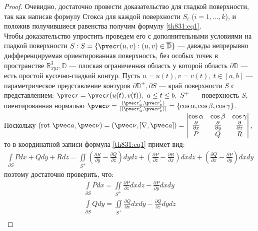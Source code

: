 \begin{proof}
  Очевидно, достаточно провести доказательство для гладкой поверхности, так как
  написав формулу Стокса для каждой поверхности $S_i$ ($i = 1, \dots, k$), и
  положив получившиеся равенства получим формулу \eqref{th831:eq1}. \\

  Чтобы доказательство упростить проведем его с дополнительными условиями на
  гладкой поверхности $S : S = \{\pvec r(u, v): (u, v) \in
  \overline{\mathbb{D}}\}$ --- давжды непрерывно дифференцируемая
  ориентированная поверхность, без особых точек в пространстве
  $\mathbb{R}_{xyz}^3, \mathbb{D}$ --- плоская ограниченная область у которой
  область $\partial \mathbb{D}$ --- есть простой кусочно-гладкий контур. Пусть
  $u = u(t), v = v(t), \ t \in [a,b]$ --- параметрическое представление
  контуров $\partial {\mathbb{D}}^+, \partial S$ --- край поверхности $S$ с
  представлением: $\pvec r = \pvec r(u(t), v(t)), \ a \leq t \leq b, \ S^+$ ---
  поверхность $S$, оиентированная нормалью $\pvec \nu = \frac{(\pvec r_u',
  \pvec r_v')}{|(\pvec r_u', \pvec r_v')|} = \{\cos \alpha, \cos \beta, \cos
  \gamma\}$. \\
  Поскольку $(\mbox{rot} \ \pvec a, \pvec \nu) = (\pvec \nu, [\nabla, \pvec a])
  = \begin{vmatrix}
    \cos \alpha & \cos \beta & \cos \gamma \\
    \frac{\partial }{\partial x} & \frac{\partial }{\partial y} &
    \frac{\partial }{\partial z} \\
    P & Q & R
  \end{vmatrix}$, то в координатной записи формула \eqref{th831:eq1} примет
  вид:
  \begin{gather}
    \int\limits_{\partial S} Pdx + Qdy + Rdz = \iint\limits_{S^+}
    \left(\frac{\partial R}{\partial y} - \frac{\partial Q}{\partial z} \right)
    dy dz + \left(\frac{\partial P}{\partial z} - \frac{\partial R}{\partial x}
    \right) dx dz + \left(\frac{\partial Q}{\partial x} - \frac{\partial
    P}{\partial y} \right) dx dy
    \label{th831:eq2}
  \end{gather}
  поэтому достаточно проверить, что:
  \begin{gather*}
    \int\limits_{\partial S} Pdx = \iint\limits_{S^+} \frac{\partial
    P}{\partial z} dx dz - \frac{\partial P}{\partial y} dx dy \\
    \int\limits_{\partial S} Qdy = \iint\limits_{S^+} \frac{\partial
    Q}{\partial x} dx dy - \frac{\partial Q}{\partial z} dy dz \\

\end{gather*}
\end{proof}
